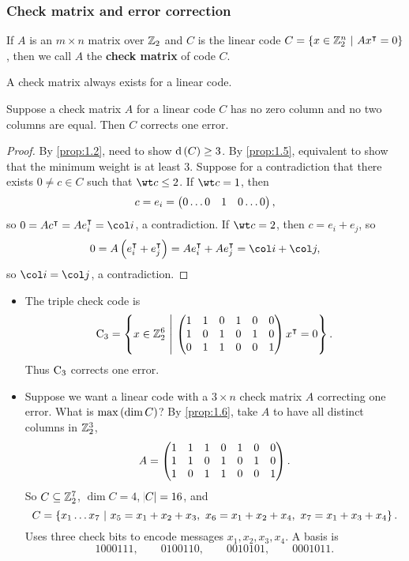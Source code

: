 \pagebreak

\subsubsection{Check matrix and error correction}

\begin{definition*}
If $ A $ is an $ m \times n $ matrix over $ \mathbb{Z}_2 $ and $ C $ is the linear code $ C = \cbr{x \in \ZZ_2^n \st Ax^\intercal = 0} $, then we call $ A $ the \textbf{check matrix} of code $ C $.
\end{definition*}

\begin{remark*}
A check matrix always exists for a linear code.
\end{remark*}

\begin{proposition}
\label{prop:1.6}
Suppose a check matrix $ A $ for a linear code $ C $ has no zero column and no two columns are equal. Then $ C $ corrects one error.
\end{proposition}

\begin{proof}
By \ref{prop:1.2}, need to show $ \d\br{C} \ge 3 $. By \ref{prop:1.5}, equivalent to show that the minimum weight is at least $ 3 $. Suppose for a contradiction that there exists $ 0 \ne c \in C $ such that $ \wt c \le 2 $. If $ \wt c = 1 $, then
$$ c = e_i = \begin{pmatrix} 0 \dots 0 & 1 & 0 \dots 0 \end{pmatrix}, $$
so $ 0 = Ac^\intercal = Ae_i^\intercal = \col i $, a contradiction. If $ \wt c = 2 $, then $ c = e_i + e_j $, so
$$ 0 = A\br{e_i^\intercal + e_j^\intercal} = Ae_i^\intercal + Ae_j^\intercal = \col i + \col j, $$
so $ \col i = \col j $, a contradiction.
\end{proof}

\begin{example*}
\hfill
\begin{itemize}
\item The triple check code is
$$ \C_3 = \cbr{x \in \ZZ_2^6 \st \threebythree{1 & 1}{0 & 1}{0 & 0}{1 & 0}{1 & 0}{1 & 0}{0 & 1}{1 & 0}{0 & 1}x^\intercal = 0}. $$
Thus $ \mathrm{C}_3 $ corrects one error.
\item Suppose we want a linear code with a $ 3 \times n $ check matrix $ A $ correcting one error. What is $ \max\br{\dim C} $? By \ref{prop:1.6}, take $ A $ to have all distinct columns in $ \mathbb{Z}_2^3 $,
$$ A = \begin{pmatrix} 1 & 1 & 1 & 0 & 1 & 0 & 0 \\ 1 & 1 & 0 & 1 & 0 & 1 & 0 \\ 1 & 0 & 1 & 1 & 0 & 0 & 1 \end{pmatrix}. $$
So $ C \subseteq \mathbb{Z}_2^7 $, $ \dim C = 4 $, $ \abs{C} = 16 $, and
$$ C = \cbr{x_1 \dots x_7 \st x_5 = x_1 + x_2 + x_3, \ x_6 = x_1 + x_2 + x_4, \ x_7 = x_1 + x_3 + x_4}. $$
Uses three check bits to encode messages $ x_1, x_2, x_3, x_4 $. A basis is
$$ 1000111, \qquad 0100110, \qquad 0010101, \qquad 0001011. $$
\end{itemize}
\end{example*}

